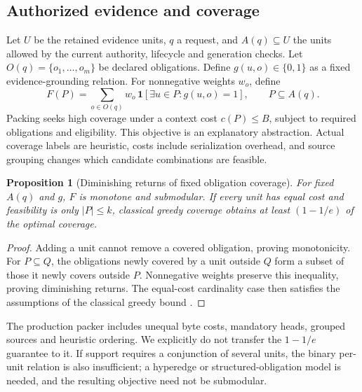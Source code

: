 \documentclass[10pt,twocolumn]{article}
\newtheorem{proposition}{Proposition}
\begin{document}
\subsection{Authorized evidence and coverage}
Let $U$ be the retained evidence units, $q$ a request, and $A(q)\subseteq U$ the units allowed by the current authority, lifecycle and generation checks. Let $O(q)=\{o_1,\ldots,o_m\}$ be declared obligations. Define $g(u,o)\in\{0,1\}$ as a fixed evidence-grounding relation. For nonnegative weights $w_o$, define
\begin{equation}
 F(P)=\sum_{o\in O(q)}w_o\,\mathbf{1}\!\left[\exists u\in P:g(u,o)=1\right],\qquad P\subseteq A(q).
 \label{eq:coverage}
\end{equation}
Packing seeks high coverage under a context cost $c(P)\leq B$, subject to required obligations and eligibility. This objective is an explanatory abstraction. Actual coverage labels are heuristic, costs include serialization overhead, and source grouping changes which candidate combinations are feasible.

\begin{proposition}[Diminishing returns of fixed obligation coverage]
For fixed $A(q)$ and $g$, $F$ is monotone and submodular. If every unit has equal cost and feasibility is only $|P|\leq k$, classical greedy coverage obtains at least $(1-1/e)$ of the optimal coverage.
\end{proposition}
\begin{proof}
Adding a unit cannot remove a covered obligation, proving monotonicity. For $P\subseteq Q$, the obligations newly covered by a unit outside $Q$ form a subset of those it newly covers outside $P$. Nonnegative weights preserve this inequality, proving diminishing returns. The equal-cost cardinality case then satisfies the assumptions of the classical greedy bound \citep{submodular}.
\end{proof}
The production packer includes unequal byte costs, mandatory heads, grouped sources and heuristic ordering. We explicitly do not transfer the $1-1/e$ guarantee to it. If support requires a conjunction of several units, the binary per-unit relation is also insufficient; a hyperedge or structured-obligation model is needed, and the resulting objective need not be submodular.
\end{document}
